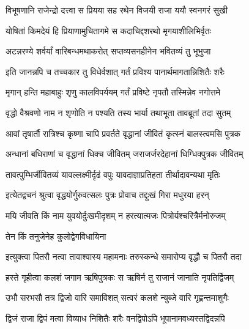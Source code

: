 

\twolineshloka
{विभूषणानि राजेन्द्रो दत्त्वा स प्रियया सह}
{रथेन विजयी राजा ययौ स्वनगरं सुखी} %

\twolineshloka
{योषितां किमदेयं हि प्रियाणामुचितागमे}
{स कदाचिद्दशरथो मृगयाशीलिभिर्वृतः} %

\twolineshloka
{अटन्नरण्ये शर्वर्यां वारिबन्धमथाकरोत्}
{सप्तव्यसनहीनेन भवितव्यं तु भूभुजा} %

\twolineshloka
{इति जानन्नपि च तच्चकार तु विधेर्वशात्}
{गर्तं प्रविश्य पानार्थमागतान्निशितैः शरैः} %

\twolineshloka
{मृगान् हन्ति महाबाहुः शृणु कालविपर्ययम्}
{गर्तं प्रविष्टे नृपतौ तस्मिन्नेव नगोत्तमे} %

\twolineshloka
{वृद्धो वैश्रवणो नाम न शृणोति न पश्यति}
{तस्य भार्या तथाभूता तावब्रूतां तदा सुतम्} %



\twolineshloka
{आवां तृषार्तौ रात्रिश्च कृष्णा चापि प्रवर्तते}
{वृद्धानां जीवितं कृत्स्नं बालस्त्वमसि पुत्रक} %

\twolineshloka
{अन्धानां बधिराणां च वृद्धानां धिक्च जीवितम्}
{जराजर्जरदेहानां धिग्धिक्पुत्रक जीवितम्} %

\twolineshloka
{तावत्पुम्भिर्जीवितव्यं यावल्लक्ष्मीर्दृढं वपुः}
{यावदाज्ञाप्रतिहता तीर्थादावन्यथा मृतिः} %


\twolineshloka
{इत्येतद्वचनं श्रुत्वा वृद्धयोर्गुरुवत्सलः}
{पुत्रः प्रोवाच तद्दुःखं गिरा मधुरया हरन्} %


\twolineshloka
{मयि जीवति किं नाम युवयोर्दुःखमीदृशम्}
{न हरत्यात्मजः पित्रोर्यश्चरित्रैर्मनोरुजम्} %

\onelineshloka
{तेन किं तनुजेनेह कुलोद्वेगविधायिना}%



\twolineshloka
{इत्युक्त्वा पितरौ नत्वा तावाश्वास्य महामनाः}
{तरुस्कन्धे समारोप्य वृद्धौ च पितरौ तदा} %

\twolineshloka
{हस्ते गृहीत्वा कलशं जगाम ऋषिपुत्रकः}
{स ऋषिर्न तु राजानं जानाति नृपतिर्द्विजम्} %

\twolineshloka
{उभौ सरभसौ तत्र द्विजो वारि समाविशत्}
{सत्वरं कलशे न्युब्जे वारि गृह्णन्तमाशुगैः} %

\twolineshloka
{द्विजं राजा द्विपं मत्वा विव्याध निशितैः शरैः}
{वनद्विपोऽपि भूपानामवध्यस्तद्विदन्नपि} %

